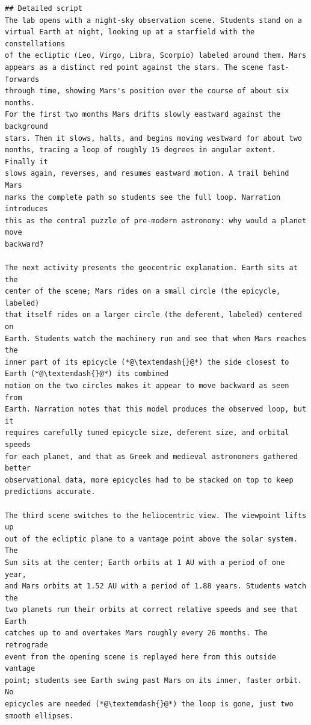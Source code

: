 \begin{lstlisting}[style=arlemlisting, caption={Complete Script-level JSON Lab input for \emph{Apparent Retrograde Motion}: system prompt, then user prompt.}, label={lst:example-prompt}]
## Detailed script
The lab opens with a night-sky observation scene. Students stand on a
virtual Earth at night, looking up at a starfield with the constellations
of the ecliptic (Leo, Virgo, Libra, Scorpio) labeled around them. Mars
appears as a distinct red point against the stars. The scene fast-forwards
through time, showing Mars's position over the course of about six months.
For the first two months Mars drifts slowly eastward against the background
stars. Then it slows, halts, and begins moving westward for about two
months, tracing a loop of roughly 15 degrees in angular extent. Finally it
slows again, reverses, and resumes eastward motion. A trail behind Mars
marks the complete path so students see the full loop. Narration introduces
this as the central puzzle of pre-modern astronomy: why would a planet move
backward?

The next activity presents the geocentric explanation. Earth sits at the
center of the scene; Mars rides on a small circle (the epicycle, labeled)
that itself rides on a larger circle (the deferent, labeled) centered on
Earth. Students watch the machinery run and see that when Mars reaches the
inner part of its epicycle (*@\textemdash{}@*) the side closest to Earth (*@\textemdash{}@*) its combined
motion on the two circles makes it appear to move backward as seen from
Earth. Narration notes that this model produces the observed loop, but it
requires carefully tuned epicycle size, deferent size, and orbital speeds
for each planet, and that as Greek and medieval astronomers gathered better
observational data, more epicycles had to be stacked on top to keep
predictions accurate.

The third scene switches to the heliocentric view. The viewpoint lifts up
out of the ecliptic plane to a vantage point above the solar system. The
Sun sits at the center; Earth orbits at 1 AU with a period of one year,
and Mars orbits at 1.52 AU with a period of 1.88 years. Students watch the
two planets run their orbits at correct relative speeds and see that Earth
catches up to and overtakes Mars roughly every 26 months. The retrograde
event from the opening scene is replayed here from this outside vantage
point; students see Earth swing past Mars on its inner, faster orbit. No
epicycles are needed (*@\textemdash{}@*) the loop is gone, just two smooth ellipses.


\end{lstlisting}
